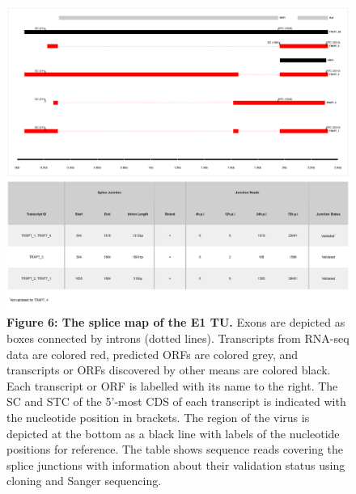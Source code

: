 \documentclass[
]{article}
\begin{document}
\begin{figure}
\centering
\includegraphics{results/r/figures/figure6.png}
\caption{\textbf{Figure 6: The splice map of the E1 TU.} Exons are
depicted as boxes connected by introns (dotted lines). Transcripts from
RNA-seq data are colored red, predicted ORFs are colored grey, and
transcripts or ORFs discovered by other means are colored black. Each
transcript or ORF is labelled with its name to the right. The SC and STC
of the 5'-most CDS of each transcript is indicated with the nucleotide
position in brackets. The region of the virus is depicted at the bottom
as a black line with labels of the nucleotide positions for reference.
The table shows sequence reads covering the splice junctions with
information about their validation status using cloning and Sanger
sequencing.}
\end{figure}
\end{document}
